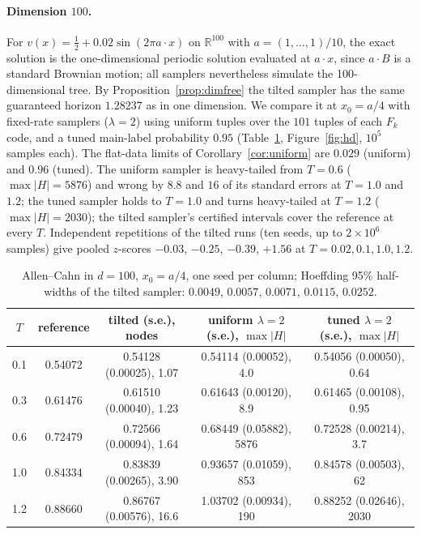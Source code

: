 \documentclass[11pt]{article}
\theoremstyle{definition}
\theoremstyle{remark}
\newcommand{\R}{\mathbb{R}}
\begin{document}
\paragraph{Dimension $100$.} For $v(x)=\frac12+0.02\sin(2\pi a\cdot x)$
on $\R^{100}$ with $a=(1,\dots,1)/10$, the exact solution is the
one-dimensional periodic solution evaluated at $a\cdot x$, since $a\cdot B$
is a standard Brownian motion; all samplers nevertheless simulate the
100-dimensional tree. By Proposition~\ref{prop:dimfree} the tilted
sampler has the same guaranteed horizon $1.28237$ as in one dimension.
We compare it at $x_0=a/4$ with fixed-rate samplers ($\lambda=2$) using
uniform tuples over the $101$ tuples of each $F_k$ code, and a tuned
main-label probability $0.95$ (Table~\ref{tab:hd}, Figure~\ref{fig:hd},
$10^5$ samples each). The flat-data limits of Corollary~\ref{cor:uniform}
are $0.029$ (uniform) and $0.96$ (tuned). The uniform sampler is heavy-tailed
from $T=0.6$ ($\max|H|=5876$) and wrong by $8.8$ and $16$ of its standard
errors at $T=1.0$ and $1.2$; the tuned sampler holds to $T=1.0$ and turns
heavy-tailed at $T=1.2$ ($\max|H|=2030$); the tilted sampler's certified
intervals cover the reference at every $T$. Independent repetitions of
the tilted runs (ten seeds, up to $2\times10^6$ samples) give pooled
$z$-scores $-0.03$, $-0.25$, $-0.39$, $+1.56$ at $T=0.02,0.1,1.0,1.2$.

\begin{table}[t]
\centering\small
\begin{tabular}{@{}ccccc@{}}
\toprule
$T$ & reference & tilted (s.e.), nodes & uniform $\lambda=2$ (s.e.), $\max|H|$ & tuned $\lambda=2$ (s.e.), $\max|H|$\\
\midrule
0.1 & 0.54072 & 0.54128 (0.00025), 1.07 & 0.54114 (0.00052), 4.0 & 0.54056 (0.00050), 0.64\\
0.3 & 0.61476 & 0.61510 (0.00040), 1.23 & 0.61643 (0.00120), 8.9 & 0.61465 (0.00108), 0.95\\
0.6 & 0.72479 & 0.72566 (0.00094), 1.64 & 0.68449 (0.05882), 5876 & 0.72528 (0.00214), 3.7\\
1.0 & 0.84334 & 0.83839 (0.00265), 3.90 & 0.93657 (0.01059), 853 & 0.84578 (0.00503), 62\\
1.2 & 0.88660 & 0.86767 (0.00576), 16.6 & 1.03702 (0.00934), 190 & 0.88252 (0.02646), 2030\\
\bottomrule
\end{tabular}
\caption{Allen--Cahn in $d=100$, $x_0=a/4$, one seed per column; Hoeffding
95\% half-widths of the tilted sampler: $0.0049$, $0.0057$, $0.0071$,
$0.0115$, $0.0252$.}
\label{tab:hd}
\end{table}
\end{document}
